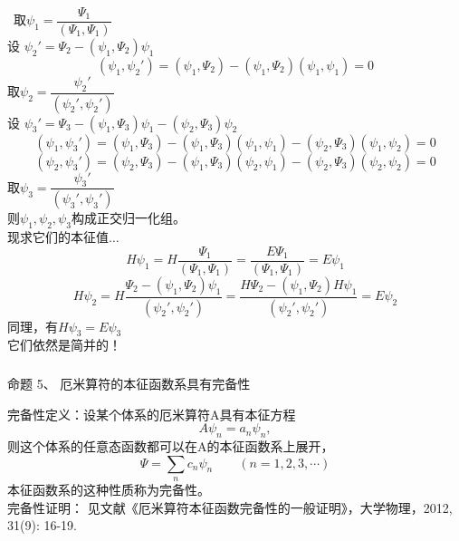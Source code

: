 \begin{frame} [allowframebreaks=]
    \frametitle{}
    \解~取$\psi_1=\dfrac{\Psi_1}{(\Psi_1, \Psi_1)}$\\
    设 $\psi_2'=\Psi_2-(\psi_1, \Psi_2)\psi_1$\\
    \begin{equation*}
        (\psi_1, \psi_2')=(\psi_1, \Psi_2)-(\psi_1, \Psi_2)(\psi_1, \psi_1)=0
    \end{equation*}  
    取$\psi_2=\dfrac{\psi_2'}{(\psi_2', \psi_2')}$\\
    设 $\psi_3'=\Psi_3-(\psi_1, \Psi_3)\psi_1-(\psi_2, \Psi_3)\psi_2$\\
    \begin{equation*}
        (\psi_1, \psi_3')=(\psi_1, \Psi_3)-(\psi_1, \Psi_3)(\psi_1, \psi_1)-(\psi_2, \Psi_3)(\psi_1, \psi_2)=0
    \end{equation*}
    \begin{equation*}
        (\psi_2, \psi_3')=(\psi_2, \Psi_3)-(\psi_1, \Psi_3)(\psi_2, \psi_1)-(\psi_2, \Psi_3)(\psi_2, \psi_2)=0
    \end{equation*}
    取$\psi_3=\dfrac{\psi_3'}{(\psi_3', \psi_3')}$\\ \vspace{0.6em}
    则$\psi_1, \psi_2, \psi_3$构成正交归一化组。\\ \vspace{0.6em}
    现求它们的本征值$\dots$\\
    $$ H\psi_1= H \dfrac{\Psi_1}{(\Psi_1, \Psi_1)} =  \dfrac{E\Psi_1}{(\Psi_1, \Psi_1)} = E \psi_1$$
    $$ H\psi_2= H \dfrac{\Psi_2-(\psi_1, \Psi_2)\psi_1}{(\psi_2', \psi_2')} =  \dfrac{H\Psi_2-(\psi_1, \Psi_2)H\psi_1}{(\psi_2', \psi_2')}=E\psi_2$$
    同理，有$ H\psi_3=E\psi_3$\\
    它们依然是简并的！
\end{frame} 

\begin{frame} [allowframebreaks=]
    \frametitle{}
    \begin{tcolorbox1}{命题 5、}
        厄米算符的本征函数系具有完备性
     \end{tcolorbox1}
    \alert{完备性定义：}设某个体系的厄米算符A具有本征方程
    \begin{equation*}
        A\psi_{n}=a_n\psi_{n}, 
    \end{equation*}  
    则这个体系的任意态函数都可以在A的本征函数系上展开，
    \begin{equation*}
        \Psi=\sum_n c_n \psi_{n} \qquad (n=1,2,3,\cdots)
    \end{equation*}
    本征函数系的这种性质称为完备性。\\
    完备性证明： 见文献《厄米算符本征函数完备性的一般证明》，大学物理，2012, 31(9): 16-19.
\end{frame} 

